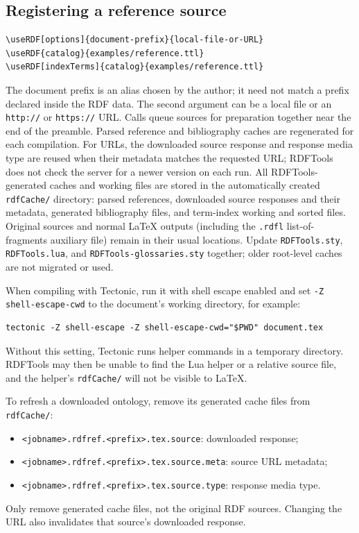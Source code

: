 \documentclass[10pt,letterpaper]{article}
\begin{document}
\subsection{Registering a reference source}

\begin{lstlisting}
\useRDF[options]{document-prefix}{local-file-or-URL}
\useRDF{catalog}{examples/reference.ttl}
\useRDF[indexTerms]{catalog}{examples/reference.ttl}
\end{lstlisting}

The document prefix is an alias chosen by the author; it need not match a
prefix declared inside the RDF data. The second argument can be a local file
or an \texttt{http://} or \texttt{https://} URL. Calls queue sources for
preparation together near the end of the preamble. Parsed reference and
bibliography caches are regenerated for each compilation. For URLs, the
downloaded source response and response media type are reused when their
metadata matches the requested URL; RDFTools does not check the server for a
newer version on each run.
All RDFTools-generated caches and working files are stored in the automatically
created \texttt{rdfCache/} directory: parsed references, downloaded source
responses and their metadata, generated bibliography files, and term-index
working and sorted files. Original sources and normal LaTeX outputs
(including the \texttt{.rdfl} list-of-fragments auxiliary file) remain
in their usual locations. Update \texttt{RDFTools.sty},
\texttt{RDFTools.lua}, and \texttt{RDFTools-glossaries.sty} together;
older root-level caches are not migrated or used.

When compiling with Tectonic, run it with shell escape enabled and set
\texttt{-Z shell-escape-cwd} to the document's working directory, for example:
\begin{lstlisting}
tectonic -Z shell-escape -Z shell-escape-cwd="$PWD" document.tex
\end{lstlisting}
Without this setting, Tectonic runs helper commands in a temporary directory.
RDFTools may then be unable to find the Lua helper or a relative source file,
and the helper's \texttt{rdfCache/} will not be visible to LaTeX.

To refresh a downloaded ontology, remove its generated cache files from
\texttt{rdfCache/}:
\begin{itemize}
\item \texttt{<jobname>.rdfref.\allowbreak<prefix>.tex.source}: downloaded response;
\item \texttt{<jobname>.rdfref.\allowbreak<prefix>.tex.source.meta}: source URL metadata;
\item \texttt{<jobname>.rdfref.\allowbreak<prefix>.tex.source.type}: response media type.
\end{itemize}
Only remove generated cache files, not the original RDF sources. Changing
the URL also invalidates that source's downloaded response.
\end{document}
